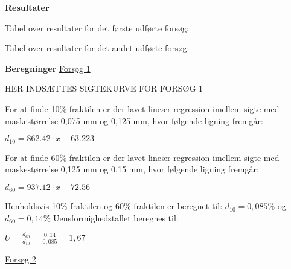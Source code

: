 \newline
\newline
\textbf{Resultater}
\newline




Tabel over resultater for det første udførte forsøg:



\newline
\newline




Tabel over resultater for det andet udførte forsøg:





\newline
\newline
\textbf{Beregninger}
\newline
\underline{Forsøg 1}
\newline
\newline




HER INDSÆTTES SIGTEKURVE FOR FORSØG 1



\newline
\newline
For at finde 10\%-fraktilen er der lavet lineær regression imellem sigte med maskestørrelse 0,075 mm og 0,125 mm, hvor følgende ligning fremgår: 

\begin{center}
	$d_{10}=862.42\cdot x - 63.223$
\end{center}

For at finde 60\%-fraktilen er der lavet lineær regression imellem sigte med maskestørrelse 0,125 mm og 0,15 mm, hvor følgende ligning fremgår:

\begin{center}
	$d_{60}=937.12\cdot x - 72.56$
\end{center}

Henholdsvis 10\%-fraktilen og 60\%-fraktilen er beregnet til: $d_{10}=0,085\%$ og $d_{60}=0,14\%$
\newline
\newline
Uensformighedstallet beregnes til:

\begin{center}
	$U = \frac{d_{60}}{d_{10}} = \frac{0,14}{0,085} = 1,67$
\end{center}

\underline{Forsøg 2}
\newline
\newline




